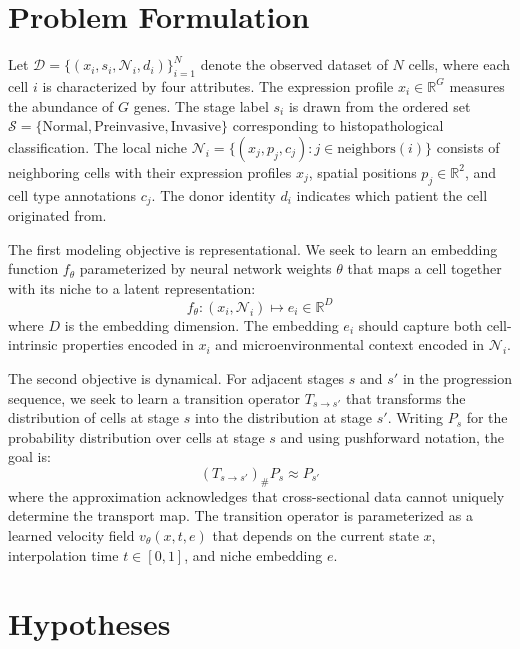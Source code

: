 \documentclass[conference]{IEEEtran}
\begin{document}
\section{Problem Formulation}

Let $\mathcal{D} = \{(x_i, s_i, \mathcal{N}_i, d_i)\}_{i=1}^N$ denote the observed dataset of $N$ cells, where each cell $i$ is characterized by four attributes. The expression profile $x_i \in \mathbb{R}^G$ measures the abundance of $G$ genes. The stage label $s_i$ is drawn from the ordered set $\mathcal{S} = \{\text{Normal}, \text{Preinvasive}, \text{Invasive}\}$ corresponding to histopathological classification. The local niche $\mathcal{N}_i = \{(x_j, p_j, c_j) : j \in \text{neighbors}(i)\}$ consists of neighboring cells with their expression profiles $x_j$, spatial positions $p_j \in \mathbb{R}^2$, and cell type annotations $c_j$. The donor identity $d_i$ indicates which patient the cell originated from.

The first modeling objective is representational. We seek to learn an embedding function $f_\theta$ parameterized by neural network weights $\theta$ that maps a cell together with its niche to a latent representation:
\begin{equation}
f_\theta: (x_i, \mathcal{N}_i) \mapsto e_i \in \mathbb{R}^D
\label{eq:embedding}
\end{equation}
where $D$ is the embedding dimension. The embedding $e_i$ should capture both cell-intrinsic properties encoded in $x_i$ and microenvironmental context encoded in $\mathcal{N}_i$.

The second objective is dynamical. For adjacent stages $s$ and $s'$ in the progression sequence, we seek to learn a transition operator $T_{s \to s'}$ that transforms the distribution of cells at stage $s$ into the distribution at stage $s'$. Writing $P_s$ for the probability distribution over cells at stage $s$ and using pushforward notation, the goal is:
\begin{equation}
(T_{s \to s'})_\# P_s \approx P_{s'}
\label{eq:transition}
\end{equation}
where the approximation acknowledges that cross-sectional data cannot uniquely determine the transport map. The transition operator is parameterized as a learned velocity field $v_\theta(x, t, e)$ that depends on the current state $x$, interpolation time $t \in [0, 1]$, and niche embedding $e$.

\section{Hypotheses}
\end{document}
